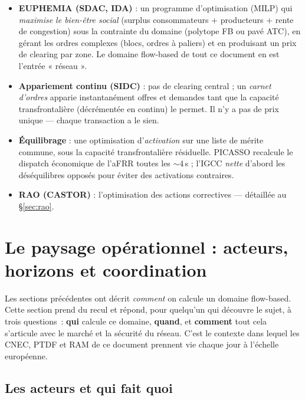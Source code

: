 \documentclass[11pt,a4paper]{article}
\begin{document}
\begin{itemize}[leftmargin=1.4em]
  \item \textbf{EUPHEMIA (SDAC, IDA)} : un programme d'optimisation
        (MILP) qui \emph{maximise le bien-être social} (surplus
        consommateurs $+$ producteurs $+$ rente de congestion) sous la
        contrainte du domaine (polytope FB ou pavé ATC), en gérant les
        ordres complexes (blocs, ordres à paliers) et en produisant un prix
        de clearing par zone. Le domaine flow-based de tout ce document en
        est l'entrée « réseau ».
  \item \textbf{Appariement continu (SIDC)} : pas de clearing central ; un
        \emph{carnet d'ordres} apparie instantanément offres et demandes
        tant que la capacité transfrontalière (décrémentée en continu)
        le permet. Il n'y a pas de prix unique — chaque transaction a le
        sien.
  \item \textbf{Équilibrage} : une optimisation d'\emph{activation} sur une
        liste de mérite commune, sous la capacité transfrontalière
        résiduelle. PICASSO recalcule le dispatch économique de l'aFRR
        toutes les $\sim$4\,s ; l'IGCC \emph{nette} d'abord les déséquilibres
        opposés pour éviter des activations contraires.
  \item \textbf{RAO (CASTOR)} : l'optimisation des actions correctives —
        détaillée au \S\ref{sec:rao}.
\end{itemize}

\section{Le paysage opérationnel : acteurs, horizons et coordination}
\label{sec:paysage}

Les sections précédentes ont décrit \emph{comment} on calcule un domaine
flow-based. Cette section prend du recul et répond, pour quelqu'un qui
découvre le sujet, à trois questions~: \textbf{qui} calcule ce domaine,
\textbf{quand}, et \textbf{comment} tout cela s'articule avec le marché et la
sécurité du réseau. C'est le contexte dans lequel les CNEC, PTDF et RAM de ce
document prennent vie chaque jour à l'échelle européenne.

\subsection{Les acteurs et qui fait quoi}
\label{sec:acteurs}
\end{document}
